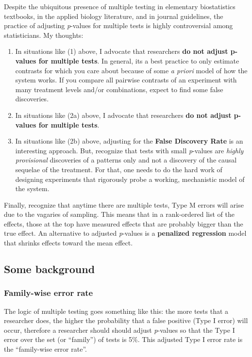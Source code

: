 \documentclass[]{book}
\providecommand{\tightlist}{%
  \setlength{\itemsep}{0pt}\setlength{\parskip}{0pt}}
\begin{document}
Despite the ubiquitous presence of multiple testing in elementary
biostatistics textbooks, in the applied biology literature, and in
journal guidelines, the practice of adjusting \emph{p}-values for
multiple tests is highly controversial among statisticians. My thoughts:

\begin{enumerate}
\def\labelenumi{\arabic{enumi}.}
\tightlist
\item
  In situations like (1) above, I advocate that researchers \textbf{do
  not adjust p-values for multiple tests}. In general, its a best
  practice to only estimate contrasts for which you care about because
  of some \emph{a priori} model of how the system works. If you compare
  all pairwise contrasts of an experiment with many treatment levels
  and/or combinations, expect to find some false discoveries.
\item
  In situations like (2a) above, I advocate that researchers \textbf{do
  not adjust p-values for multiple tests}.
\item
  In situations like (2b) above, adjusting for the \textbf{False
  Discovery Rate} is an interesting approach. But, recognize that tests
  with small \emph{p}-values are \emph{highly provisional} discoveries
  of a patterns only and not a discovery of the causal sequelae of the
  treatment. For that, one needs to do the hard work of designing
  experiments that rigorously probe a working, mechanistic model of the
  system.
\end{enumerate}

Finally, recognize that anytime there are multiple tests, Type M errors
will arise due to the vagaries of sampling. This means that in a
rank-ordered list of the effects, those at the top have measured effects
that are probably bigger than the true effect. An alternative to
adjusted \emph{p}-values is a \textbf{penalized regression} model that
shrinks effects toward the mean effect.

\subsection{Some background}\label{some-background}

\subsubsection{Family-wise error rate}\label{family-wise-error-rate}

The logic of multiple testing goes something like this: the more tests
that a researcher does, the higher the probability that a false positive
(Type I error) will occur, therefore a researcher should should adjust
\emph{p}-values so that the Type I error over the set (or ``family'') of
tests is 5\%. This adjusted Type I error rate is the ``family-wise error
rate''.
\end{document}

